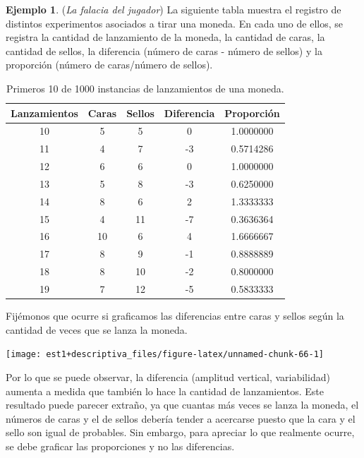 \documentclass[
  11pt,
]{book}
\theoremstyle{definition}
\theoremstyle{definition}
\newtheorem{example}{Ejemplo}[chapter]
\theoremstyle{definition}
\theoremstyle{definition}
\theoremstyle{remark}
\begin{document}
\begin{example}
\protect\hypertarget{exm:falaciadeljugador}{}\label{exm:falaciadeljugador}(\emph{La falacia del jugador}) La siguiente tabla muestra el registro de distintos experimentos asociados a tirar una moneda. En cada uno de ellos, se registra la cantidad de lanzamiento de la moneda, la cantidad de caras, la cantidad de sellos, la diferencia (número de caras - número de sellos) y la proporción (número de caras/número de sellos).

\begin{table}[H]
\centering
\caption{\label{tab:unnamed-chunk-65}Primeros 10 de 1000 instancias de lanzamientos de una moneda.}
\centering
\begin{tabular}[t]{ccccc}
\toprule
Lanzamientos & Caras & Sellos & Diferencia & Proporción\\
\midrule
10 & 5 & 5 & 0 & 1.0000000\\
11 & 4 & 7 & -3 & 0.5714286\\
12 & 6 & 6 & 0 & 1.0000000\\
13 & 5 & 8 & -3 & 0.6250000\\
14 & 8 & 6 & 2 & 1.3333333\\
15 & 4 & 11 & -7 & 0.3636364\\
16 & 10 & 6 & 4 & 1.6666667\\
17 & 8 & 9 & -1 & 0.8888889\\
18 & 8 & 10 & -2 & 0.8000000\\
19 & 7 & 12 & -5 & 0.5833333\\
\bottomrule
\end{tabular}
\end{table}

Fijémonos que ocurre si graficamos las diferencias entre caras y sellos según la cantidad de veces que se lanza la moneda.

\begin{center}\texttt{[image: est1+descriptiva\_files/figure-latex/unnamed-chunk-66-1]} \end{center}

Por lo que se puede observar, la diferencia (amplitud vertical, variabilidad) aumenta a medida que también lo hace la cantidad de lanzamientos. Este resultado puede parecer extraño, ya que cuantas más veces se lanza la moneda, el números de caras y el de sellos debería tender a acercarse puesto que la cara y el sello son igual de probables. Sin embargo, para apreciar lo que realmente ocurre, se debe graficar las proporciones y no las diferencias.


\end{example}
\end{document}
